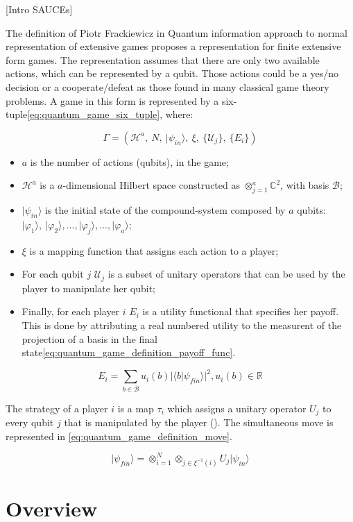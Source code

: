 [Intro SAUCEs]

The definition of Piotr Frackiewicz in Quantum information approach
to normal representation of extensive games proposes a representation
for finite extensive form games. The representation assumes that there
are only two available actions, which can be represented by a qubit.
Those actions could be a yes/no decision or a cooperate/defeat as
those found in many classical game theory problems. A game in this
form is represented by a six-tuple\ref{eq:quantum_game_six_tuple},
where:

\begin{equation}
\Gamma=(\mathcal{H}^{a},\: N,\:\vert\psi_{in}\rangle,\:\xi,\:\{\mathcal{U}_{j}\},\:\{E_{i}\})\label{eq:quantum_game_six_tuple}
\end{equation}

\begin{itemize}
\item $a$ is the number of actions (qubits), in the game; 
\item $\mathcal{H}^{a}$ is a $a$-dimensional Hilbert space constructed
as $\otimes_{j=1}^{a}\mathbb{C}^{2}$, with basis $\mathcal{B}$;
\item $\vert\psi_{in}\rangle$ is the initial state of the compound-system
composed by $a$ qubits: $\vert\varphi_{1}\rangle,\:\vert\varphi_{2}\rangle, ..., \vert\varphi_{j}\rangle, ..., \vert\varphi_{a}\rangle$;
\item $\xi$ is a mapping function that assigns each action to a player;
\item For each qubit $j$ $\mathcal{U}_{j}$ is a subset of unitary operators
that can be used by the player to manipulate her qubit;
\item Finally, for each player $i$ $E_{i}$ is a utility functional that
specifies her payoff. This is done by attributing a real numbered utility to the measurent of the projection of a basis in the final state\ref{eq:quantum_game_definition_payoff_func}.\end{itemize}

\begin{equation}
E_{i}=\sum_{b \in \mathcal{B}} u_{i}(b)\vert \langle b\vert \psi_{fin}\rangle\vert^{2}, u_{i}(b) \in \mathbb{R}
\label{eq:quantum_game_definition_payoff_func}
\end{equation}

The strategy of a player $i$ is a map $\tau_{i}$ which assigns a
unitary operator $U_{j}$ to every qubit $j$ that is manipulated
by the player ().
The simultaneous move is represented in \ref{eq:quantum_game_definition_move}.

\begin{equation}
\vert\psi_{fin}\rangle=\otimes_{i=1}^{N}\otimes_{j\in\xi^{-1}(i)}U_{j}\vert\psi_{in}\rangle\label{eq:quantum_game_definition_move}
\end{equation}

\section{Overview}
\label{sec:background_overview}

